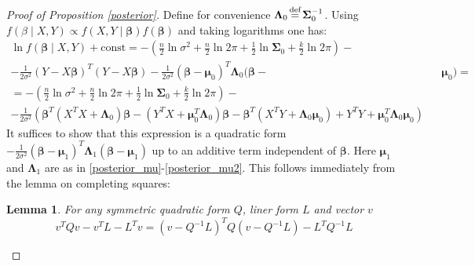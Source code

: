 \documentclass[10pt,fleqn]{amsart}
\newtheorem{lemma}[theorem]{Lemma}
\theoremstyle{definition}
\theoremstyle{remark}
\numberwithin{equation}{section}
\newcommand{\eq}{\stackrel{\mathclap{\normalfont\text{def}}}{=}}
\newcommand{\const}{\text{const}}
\newcommand{\bbeta}{\boldsymbol{\beta}}
\newcommand{\mmu}{\boldsymbol{\mu}}
\newcommand{\SSigma}{\boldsymbol{\Sigma}}
\newcommand{\LLambda}{\boldsymbol{\Lambda}}
\begin{document}
\begin{proof}[Proof of Proposition \ref{posterior}]
Define for convenience $\LLambda_0\eq\SSigma_0^{-1}$. Using $f(\beta\mid X, Y)\propto f(X, Y\mid \bbeta)f(\bbeta)$ and taking logarithms one has:
\begin{equation*}\begin{split}
    \ln f(\bbeta\mid X, Y)+\const=-\left(\frac n 2 \ln{\sigma^2}+\frac n 2\ln 2\pi+\frac 1 2 \ln \SSigma_0+\frac k 2 \ln 2\pi\right)-&&\\
    -\frac 1{2\sigma^2}(Y-X\bbeta)^T(Y-X\bbeta)-\frac 1{2\sigma^2}(\bbeta-\mmu_0)^T\LLambda_0(\bbeta -&&\mmu_0)=\\
    =-\left(\frac n 2\ln{\sigma^2}+\frac n 2\ln 2\pi+\frac 1 2 \ln \SSigma_0+\frac k 2 \ln 2\pi\right)-&&\\
    -\frac 1{2\sigma^2}\left(\bbeta^T\left(X^TX+\LLambda_0\right)\bbeta-(Y^TX+\mmu_0^T\LLambda_0)\bbeta-
    \bbeta^T\left(X^TY+\LLambda_0\mmu_0\right)+Y^TY+\mmu_0^T\LLambda_0\mmu_0\right)&&
\end{split}\end{equation*}
It suffices to show that this expression is a quadratic form $-\frac 1 {2\sigma^2}(\bbeta-\mmu_1)^T\LLambda_1(\bbeta-\mmu_1)$
up to an additive term independent of $\bbeta$. Here $\mmu_1$ and $\LLambda_1$ are as in \ref{posterior_mu}-\ref{posterior_mu2}.
This follows immediately from the lemma on completing squares:
\begin{lemma}\label{lemmaQ}
    For any symmetric quadratic form $Q$, liner form $L$ and vector $v$
    \begin{equation*}
        v^TQv-v^TL-L^Tv=(v-Q^{-1}L)^TQ(v-Q^{-1}L)-L^TQ^{-1}L
    \end{equation*}
\end{lemma}
\end{proof}
\end{document}
